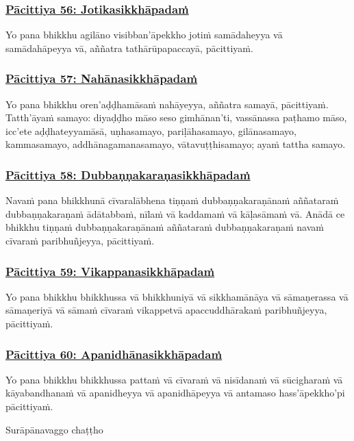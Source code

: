 \subsubsection*{\hyperref[exp56]{Pācittiya 56: Jotikasikkhāpadaṁ}}
\label{pac56}
Yo pana bhikkhu agilāno visibban'āpekkho jotiṁ samādaheyya vā samādahāpeyya vā, aññatra tathārūpapaccayā, pācittiyaṁ.

\subsubsection*{\hyperref[exp57]{Pācittiya 57: Nahānasikkhāpadaṁ}}
\label{pac57}
Yo pana bhikkhu oren'aḍḍhamāsaṁ nahāyeyya, aññatra samayā, pācittiyaṁ. Tatth'āyaṁ samayo: diyaḍḍho māso seso gimhānan'ti, vassānassa paṭhamo māso, icc'ete aḍḍhateyyamāsā, uṇhasamayo, pariḷāhasamayo, gilānasamayo, kammasamayo, addhānagamanasamayo, vātavuṭṭhisamayo; ayaṁ tattha samayo.

\subsubsection*{\hyperref[exp58]{Pācittiya 58: Dubbaṇṇakaraṇasikkhāpadaṁ}}
\label{pac58}
Navaṁ pana bhikkhunā cīvaralābhena tiṇṇaṁ dubbaṇṇakaraṇānaṁ aññataraṁ dubbaṇṇakaraṇaṁ ādātabbaṁ, nīlaṁ vā kaddamaṁ vā kāḷasāmaṁ vā. Anādā ce bhikkhu tiṇṇaṁ dubbaṇṇakaraṇānaṁ aññataraṁ dubbaṇṇakaraṇaṁ navaṁ cīvaraṁ paribhuñjeyya, pācittiyaṁ.

\subsubsection*{\hyperref[exp59]{Pācittiya 59: Vikappanasikkhāpadaṁ}}
\label{pac59}
Yo pana bhikkhu bhikkhussa vā bhikkhuniyā vā sikkhamānāya vā sāmaṇerassa vā sāmaṇeriyā vā sāmaṁ cīvaraṁ vikappetvā apaccuddhārakaṁ paribhuñjeyya, pācittiyaṁ.

\subsubsection*{\hyperref[exp60]{Pācittiya 60: Apanidhānasikkhāpadaṁ}}
\label{pac60}
Yo pana bhikkhu bhikkhussa pattaṁ vā cīvaraṁ vā nisīdanaṁ vā sūcigharaṁ vā kāyabandhanaṁ vā apanidheyya vā apanidhāpeyya vā antamaso hass'āpekkho'pi pācittiyaṁ.

\begin{center}
  Surāpānavaggo chaṭṭho
\end{center}

